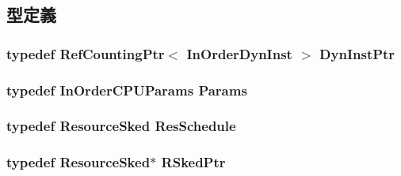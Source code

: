 \subsection{型定義}
\hypertarget{namespaceThePipeline_a992959fefcd659c6ba422aa4de14677c}{
\subsubsection[{DynInstPtr}]{\setlength{\rightskip}{0pt plus 5cm}typedef {\bf RefCountingPtr}$<$ {\bf InOrderDynInst} $>$ {\bf DynInstPtr}}}
\label{namespaceThePipeline_a992959fefcd659c6ba422aa4de14677c}
\hypertarget{namespaceThePipeline_ab62ca16eeca26566ad2422b5df4943ce}{
\subsubsection[{Params}]{\setlength{\rightskip}{0pt plus 5cm}typedef InOrderCPUParams {\bf Params}}}
\label{namespaceThePipeline_ab62ca16eeca26566ad2422b5df4943ce}
\hypertarget{namespaceThePipeline_a5b095dc783c5dc7d8c0c1fd4c7c2404c}{
\subsubsection[{ResSchedule}]{\setlength{\rightskip}{0pt plus 5cm}typedef {\bf ResourceSked} {\bf ResSchedule}}}
\label{namespaceThePipeline_a5b095dc783c5dc7d8c0c1fd4c7c2404c}
\hypertarget{namespaceThePipeline_a3c31767e98b29d5b17248f4c92fec587}{
\subsubsection[{RSkedPtr}]{\setlength{\rightskip}{0pt plus 5cm}typedef {\bf ResourceSked}$\ast$ {\bf RSkedPtr}}}
\label{namespaceThePipeline_a3c31767e98b29d5b17248f4c92fec587}


